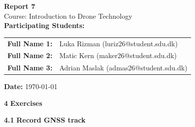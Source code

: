 \documentclass[12pt,a4paper]{article}
\begin{document}

\begin{titlepage}
    \centering
    \vspace*{3cm}

    {\Huge \bfseries Report 7}\\[0.5cm]
    {\large Course: Introduction to Drone Technology}\\[3cm]

    \textbf{\Large Participating Students:}\\[0.8cm]

    \begin{tabular}{ll}
        \textbf{Full Name 1:} & Luka Rizman (luriz26@student.sdu.dk) \\
        \textbf{Full Name 2:} & Matic Kern (maker26@student.sdu.dk) \\
        \textbf{Full Name 3:} & Adrian Maslak (admas26@student.sdu.dk) \\
    \end{tabular}

    \vfill

    {\large \textbf{Date:} \today}

    \vspace*{1.5cm}
\end{titlepage}


\clearpage
{}
\setcounter{section}{3}


\par\medskip
\noindent\textbf{4}\quad
\textbf{Exercises}


\par\medskip
\noindent\textbf{4.1}\quad
\textbf{Record GNSS track}
\end{document}
